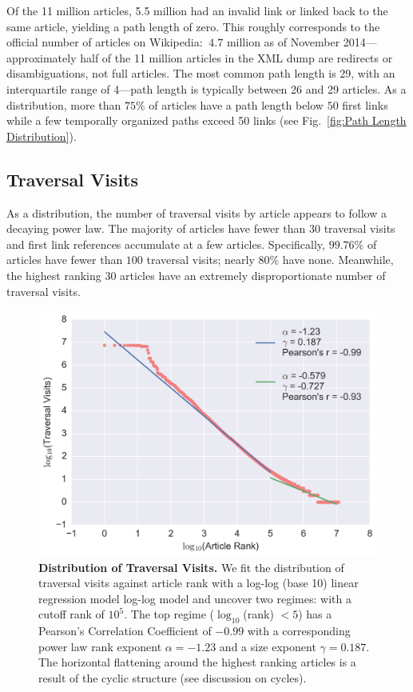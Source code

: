 \documentclass[pre,twocolumn,twoside,superscriptaddress,floatfix, aps, 10pt]{revtex4-1}
\begin{document}
Of the 11 million articles, 5.5 million had an invalid link or linked back to the same article, yielding a path length of zero. 
This roughly corresponds to the official number of articles on Wikipedia: 
$~4.7$ million as of November 2014---approximately half of the 11 million 
articles in the XML dump are redirects or disambiguations, not full articles.
The most common path length is 29, with an interquartile range of 4---path length
is typically between 26 and 29 articles.
As a distribution, more than $75\%$ of articles have a path length below 
$50$ first links 
while a few temporally organized paths exceed 50 links 
(see Fig.~\ref{fig:Path Length Distribution}). 



\subsection{Traversal Visits}

As a distribution, the number of traversal visits by article appears to follow a decaying power law. 
The majority of articles have fewer than 30 traversal visits and
first link references accumulate at a few articles.
Specifically, $99.76\%$ of articles have fewer than $100$ traversal visits; nearly $80\%$ have none. 
Meanwhile, the highest ranking 30 articles have an extremely disproportionate number of traversal visits.

\begin{figure}[tp!]
  \includegraphics[width=\columnwidth]{graphics/traversals_per_article.png} 
  \caption{
    \textbf{Distribution of Traversal Visits.}
We fit the distribution of traversal visits against article rank with a log-log (base 10) linear regression model log-log model and uncover two regimes: 
with a cutoff rank of $10^{5}$.
The top regime ($\log_{10}$(rank) $< 5$) has a Pearson's Correlation 
Coefficient of $-0.99$ with a corresponding power law rank exponent 
$\alpha = -1.23$ and a size exponent $\gamma = 0.187$.
The horizontal flattening around the highest
ranking articles is a result of the cyclic structure (see discussion on cycles).}
  \label{fig:Distribution of Visits}

\end{figure}
\end{document}

